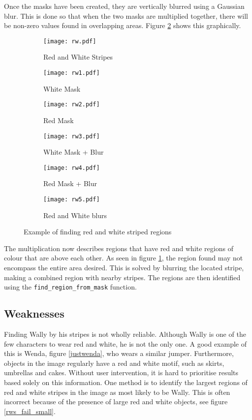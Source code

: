 \documentclass[../main.tex]{subfiles}
\begin{document}
    Once the masks have been created, they are vertically blurred using a Gaussian blur.
    This is done so that when the two masks are multiplied together, there will be non-zero values found in overlapping areas.
    Figure \ref{rw_example} shows this graphically.
    \begin{figure}[H]
      \centering
      \begin{subfigure}[B]{0.3\textwidth}
        \centering
        \texttt{[image: rw.pdf]}
        \caption{Red and White Stripes}
      \end{subfigure}
      \begin{subfigure}[B]{0.3\textwidth}
        \centering
        \texttt{[image: rw1.pdf]}
        \caption{White Mask}
      \end{subfigure}
      \begin{subfigure}[B]{0.3\textwidth}
        \centering
        \texttt{[image: rw2.pdf]}
        \caption{Red Mask}
      \end{subfigure}

      \begin{subfigure}[B]{0.3\textwidth}
        \centering
        \texttt{[image: rw3.pdf]}
        \caption{White Mask + Blur}
      \end{subfigure}
      \begin{subfigure}[B]{0.3\textwidth}
        \centering
        \texttt{[image: rw4.pdf]}
        \caption{Red Mask + Blur}
      \end{subfigure}
      \begin{subfigure}[B]{0.3\textwidth}
        \centering
        \texttt{[image: rw5.pdf]}
        \caption{Red and White blurs}
        \label{rw_stripe_ex}
      \end{subfigure}
      \caption{Example of finding red and white striped regions}
      \label{rw_example}
    \end{figure}
    The multiplication now describes regions that have red and white regions of colour that are above each other.
    As seen in figure \ref{rw_stripe_ex}, the region found may not encompass the entire area desired.
    This is solved by blurring the located stripe, making a combined region with nearby stripes.
    The regions are then identified using the \texttt{find\_region\_from\_mask} function.
  \subsection{Weaknesses}
    Finding Wally by his stripes is not wholly reliable.
    Although Wally is one of the few characters to wear red and white, he is not the only one.
    A good example of this is Wenda, figure \ref{justwenda}, who wears a similar jumper.
    Furthermore, objects in the image regularly have a red and white motif, such as skirts, umbrellas and cakes.
    Without user intervention, it is hard to prioritise results based solely on this information.
    One method is to identify the largest regions of red and white stripes in the image as most likely to be Wally.
    This is often incorrect because of the presence of large red and white objects, see figure \ref{rws_fail_small}.
\end{document}
